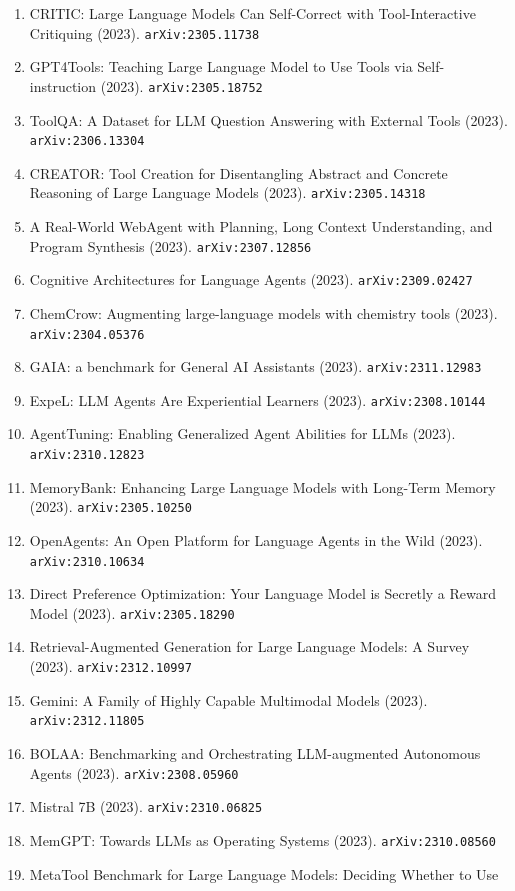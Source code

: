\documentclass[11pt]{article}
\begin{document}
\begin{enumerate}
  \item CRITIC: Large Language Models Can Self-Correct with Tool-Interactive
  Critiquing (2023). \texttt{arXiv:2305.11738}
  \item GPT4Tools: Teaching Large Language Model to Use Tools via
  Self-instruction (2023). \texttt{arXiv:2305.18752}
  \item ToolQA: A Dataset for LLM Question Answering with External Tools (2023). \texttt{arXiv:2306.13304}
  \item CREATOR: Tool Creation for Disentangling Abstract and Concrete Reasoning
  of Large Language Models (2023). \texttt{arXiv:2305.14318}
  \item A Real-World WebAgent with Planning, Long Context Understanding, and
  Program Synthesis (2023). \texttt{arXiv:2307.12856}
  \item Cognitive Architectures for Language Agents (2023). \texttt{arXiv:2309.02427}
  \item ChemCrow: Augmenting large-language models with chemistry tools (2023). \texttt{arXiv:2304.05376}
  \item GAIA: a benchmark for General AI Assistants (2023). \texttt{arXiv:2311.12983}
  \item ExpeL: LLM Agents Are Experiential Learners (2023). \texttt{arXiv:2308.10144}
  \item AgentTuning: Enabling Generalized Agent Abilities for LLMs (2023). \texttt{arXiv:2310.12823}
  \item MemoryBank: Enhancing Large Language Models with Long-Term Memory (2023). \texttt{arXiv:2305.10250}
  \item OpenAgents: An Open Platform for Language Agents in the Wild (2023). \texttt{arXiv:2310.10634}
  \item Direct Preference Optimization: Your Language Model is Secretly a Reward
  Model (2023). \texttt{arXiv:2305.18290}
  \item Retrieval-Augmented Generation for Large Language Models: A Survey (2023). \texttt{arXiv:2312.10997}
  \item Gemini: A Family of Highly Capable Multimodal Models (2023). \texttt{arXiv:2312.11805}
  \item BOLAA: Benchmarking and Orchestrating LLM-augmented Autonomous Agents (2023). \texttt{arXiv:2308.05960}
  \item Mistral 7B (2023). \texttt{arXiv:2310.06825}
  \item MemGPT: Towards LLMs as Operating Systems (2023). \texttt{arXiv:2310.08560}
  \item MetaTool Benchmark for Large Language Models: Deciding Whether to Use

\end{enumerate}
\end{document}
